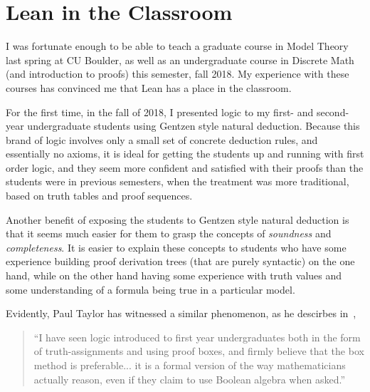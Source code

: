 \documentclass[12pt]{amsart}  %
\begin{document}
\fi






\section{Lean in the Classroom}

I was fortunate enough to be able to teach a graduate course in Model Theory
last spring at CU Boulder, as well as an undergraduate course in Discrete Math (and introduction to proofs) this semester, fall 2018.  My experience with these courses has convinced
me that Lean has a place in the classroom.

For the first time, in the fall of 2018, I presented logic
to my first- and second-year undergraduate students using Gentzen style natural deduction.
Because this brand of logic involves only a small set of concrete deduction rules,
and essentially no axioms, it is ideal for getting the students up and running
with first order logic, and they seem more confident and satisfied with their proofs than
the students were in previous semesters, when the treatment was more traditional,
based on truth tables and proof sequences.

Another benefit of exposing the students to Gentzen style natural deduction
is that it seems much easier for them to grasp the concepts of \emph{soundness} and \emph{completeness}.  
It is easier to explain these concepts to students who have some
experience building proof derivation trees (that are purely syntactic) on the one hand,
while on the other hand having some experience with truth values and some understanding 
of a formula being true in a particular model.

Evidently, Paul Taylor has witnessed a similar phenomenon, as
he descirbes in~\cite{MR1694820},
\begin{quote}
``I have seen logic introduced to first year undergraduates
both in the form of truth-assignments and using proof boxes, and firmly
believe that the box method is preferable... %
it is a formal version of the way mathematicians
actually reason, even if they claim to use Boolean algebra when asked.''
\end{quote}
\end{document}
